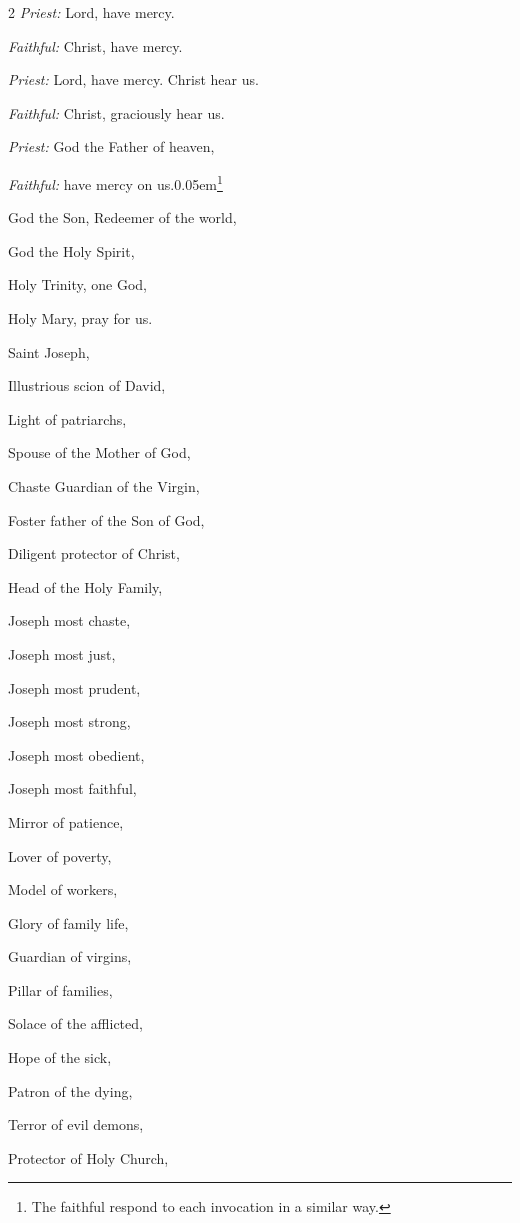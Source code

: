\begin{enpars}
\begin{multicols}{2}
\raggedcolumns
\textit{Priest:} Lord, have mercy.

\textit{Faithful:} Christ, have mercy.

\textit{Priest:} Lord, have mercy. Christ hear us.

\textit{Faithful:} Christ, graciously hear us.

\textit{Priest:} God the Father of heaven,

\textit{Faithful:} have mercy on us.\kern 0.05em\footnote{\raggedright{The faithful respond to each invocation in a similar way.}\par}

God the Son, Redeemer of the world,

God the Holy Spirit,

Holy Trinity, one God,

Holy Mary, pray for us.

Saint Joseph,

Illustrious scion of David,

Light of patriarchs,

Spouse of the Mother of God,

Chaste Guardian of the Virgin,

Foster father of the Son of God,

Diligent protector of Christ,

Head of the Holy Family,

Joseph most chaste,

Joseph most just,

Joseph most prudent,

Joseph most strong,

Joseph most obedient,

Joseph most faithful,

Mirror of patience,

Lover of poverty,

Model of workers,

Glory of family life,

Guardian of virgins,

Pillar of families,

Solace of the afflicted,

Hope of the sick,

Patron of the dying,

 Terror of evil demons,
 
 Protector of Holy Church,
  

\end{multicols}
\end{enpars}
